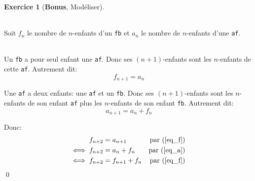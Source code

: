 \documentclass{exam}
\theoremstyle{definition}
\newtheorem{exercice}{Exercice}
\begin{document}
\begin{exercice}[\textbf{Bonus}, Modéliser]
\begin{center}
{{\begin{minipage}{\linewidth}
        ~\\
        Soit $f_n$ le nombre de $n$-enfants d'un \texttt{fb} et $a_n$ le nombre de $n$-enfants d'une \texttt{af}.

        ~\\
        Un \texttt{fb} a pour seul enfant une \texttt{af}.
        Donc ses $(n+1)$-enfants sont les $n$-enfants de cette \texttt{af}.
        Autrement dit:
        \begin{equation}~\label{eq_f}
            f_{n+1} = a_{n}
        \end{equation}

        Une \texttt{af} a deux enfants: une \texttt{af} et un \texttt{fb}.
        Donc ses $(n+1)$-enfants sont les $n$-enfants de son enfant \texttt{af} plus les $n$-enfants de son enfant \texttt{fb}.
        Autrement dit:
        \begin{equation}~\label{eq_a}
            a_{n+1} = a_n + f_n
        \end{equation}

        Donc:
        \begin{align*}
            f_{n+2} &= a_{n+1} &\text{par (\ref{eq_f})} \\
            \iff f_{n+2} &= a_{n} + f_n &\text{par (\ref{eq_a})}\\
            \iff f_{n+2} &= f_{n+1} + f_n  &\text{par (\ref{eq_f})}
        \end{align*}
        \qed
        \end{minipage}
        \vspace{8em}
        }}
    \end{center}
\end{exercice}
\end{document}
